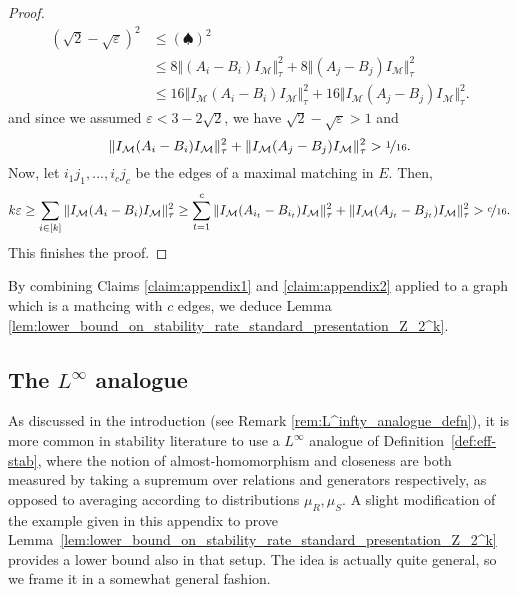 \documentclass[11pt]{article}
\theoremstyle{definition}
\newcommand{\Id}{\ensuremath{I}}
\newcommand{\mM}{\ensuremath{\mathcal{M}}}
\newcommand{\eps}{\varepsilon}
\begin{document}
\begin{proof}
\begin{align*}
    (\sqrt{2}-\sqrt\eps)^2&\leq (\spadesuit)^2\\
    &\leq 8\Vert(A_i-B_i)\Id_\mM\Vert_\tau^2+8\Vert(A_j-B_j)\Id_\mM\Vert_\tau^2\\
    &\leq 16 \Vert \Id_\mM (A_i-B_i)\Id_\mM\Vert_\tau^2+16 \Vert \Id_\mM (A_j-B_j)\Id_\mM\Vert_\tau^2.
\end{align*}
and since we assumed $\eps<3-2\sqrt{2}$, we have $\sqrt{2}-\sqrt\eps> 1$ and 
\[
 \Vert \Id_\mM (A_i-B_i)\Id_\mM\Vert_\tau^2+ \Vert \Id_\mM (A_j-B_j)\Id_\mM\Vert_\tau^2> \nicefrac{1}{16}.
\]
Now, let $i_1j_1,...,i_cj_c$ be the edges of a maximal  matching in $E$. Then,
\[
k\eps \geq \sum_{i\in [k]}\Vert \Id_\mM (A_i-B_i)\Id_\mM\Vert_\tau^2\geq \sum_{t=1}^c\Vert \Id_\mM (A_{i_t}-B_{i_t})\Id_\mM\Vert_\tau^2+ \Vert \Id_\mM (A_{j_t}-B_{j_t})\Id_\mM\Vert_\tau^2>\nicefrac{c}{16}.
\]
This finishes the proof.
\end{proof}

By combining Claims \ref{claim:appendix1} and \ref{claim:appendix2} applied to a graph which is a mathcing with $c$ edges, we deduce Lemma \ref{lem:lower_bound_on_stability_rate_standard_presentation_Z_2^k}.


\subsection{The $L^\infty$ analogue}
As discussed in the introduction (see Remark \ref{rem:L^infty_analogue_defn}), it is more common in stability literature to use a $L^\infty$ analogue of Definition~\ref{def:eff-stab}, where the notion of almost-homomorphism and closeness are both measured by taking a supremum over relations and generators respectively, as opposed to averaging according to distributions $\mu_R,\mu_S$. 
A slight modification of the example given in  this appendix to prove Lemma~\ref{lem:lower_bound_on_stability_rate_standard_presentation_Z_2^k} provides a lower bound also in that setup. The idea is actually quite general, so we frame it in a somewhat general fashion. 
\end{document}
